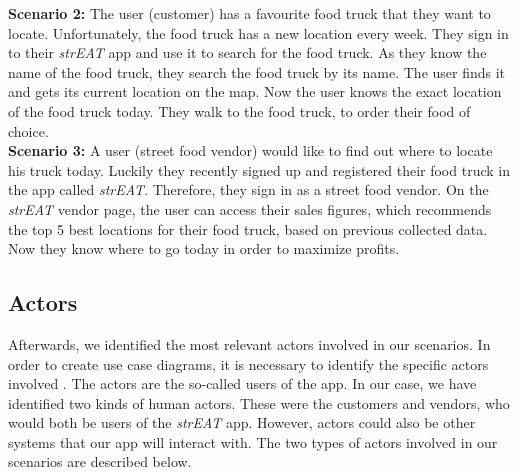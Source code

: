 \textbf{Scenario 2:}
The user (customer) has a favourite food truck that they want to locate. Unfortunately, the food truck has a new location every week. They sign in to their \textit{strEAT} app and use it to search for the food truck. As they know the name of the food truck, they search the food truck by its name. The user finds it and gets its current location on the map. Now the user knows the exact location of the food truck today. They walk to the food truck, to order their food of choice.
\\

\textbf{Scenario 3:}
A user (street food vendor) would like to find out where to locate his truck today. Luckily they recently signed up and registered their food truck in the app called \textit{strEAT}. Therefore, they sign in as a street food vendor. On the \textit{strEAT} vendor page, the user can access their sales figures, which recommends the top 5 best locations for their food truck, based on previous collected data. Now they know where to go today in order to maximize profits.
\\
\subsection{Actors}
Afterwards, we identified the most relevant actors involved in our scenarios. In order to create use case diagrams, it is necessary to identify the specific actors involved \cite{Sommerville}. The actors are the so-called users of the app. In our case, we have identified two kinds of human actors. These were the customers and vendors, who would both be users of the \textit{strEAT} app. However, actors could also be other systems that our app will interact with. The two types of actors involved in our scenarios are described below.
\\

